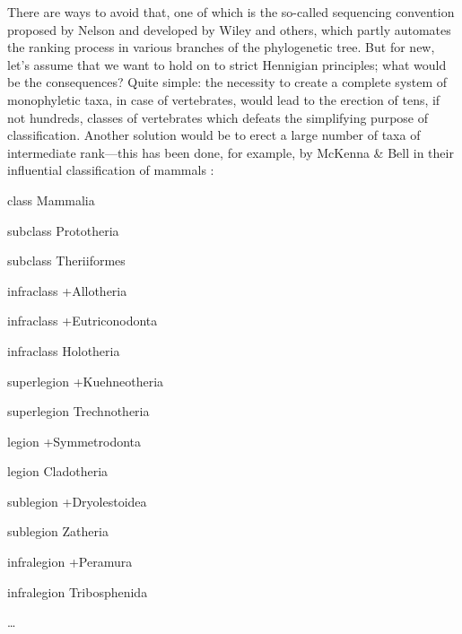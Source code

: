 \begin{artengenv}
There are ways to avoid that, one of which is the so-called sequencing convention proposed by Nelson
\parencite*{nelson_phylogenetic_1972}
and developed by Wiley
\parencite*{wiley_phylogenetics:_1981}
and others, which partly
automates the ranking process in various branches of the phylogenetic tree. But for new, let’s assume that we want to
hold on to strict Hennigian principles; what would be the consequences? Quite simple: the necessity to create a
complete system of monophyletic taxa, in case of vertebrates, would lead to the erection of tens, if not hundreds,
classes of vertebrates which defeats the simplifying purpose of classification. Another solution would be to erect a
large number of taxa of intermediate rank---this has been done, for example, by McKenna \& Bell in their influential
classification of mammals
\parencite{mckenna_classification_1997}:

\begin{longitemize}
\item class Mammalia
\begin{longitemize}
\item subclass Prototheria
\item subclass Theriiformes
\begin{longitemize}
\item infraclass +Allotheria
\item infraclass +Eutriconodonta
\item infraclass Holotheria
\begin{longitemize}
\item superlegion +Kuehneotheria
\item superlegion Trechnotheria
\begin{longitemize}
\item legion +Symmetrodonta
\item legion Cladotheria
\begin{longitemize}
\item sublegion +Dryolestoidea
\item sublegion Zatheria
\begin{longitemize}
\item infralegion +Peramura
\item infralegion Tribosphenida
\item \ldots
\end{longitemize}
\end{longitemize}
\end{longitemize}
\end{longitemize}
\end{longitemize}
\end{longitemize}
\end{longitemize}


\end{artengenv}
